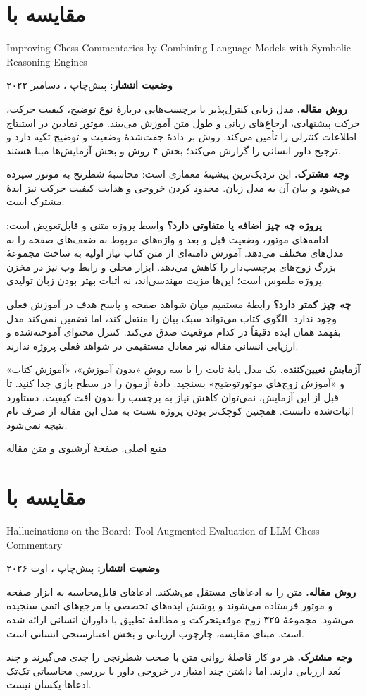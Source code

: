\documentclass[a4paper,12pt]{article}
\newcommand{\en}[1]{\lr{#1}}
\newcommand{\source}[2]{\par\small منبع اصلی: \href{#1}{#2}\par\normalsize}
\newcommand{\paper}[3]{\clearpage\section{#1}\begin{latin}\small #2\end{latin}\textbf{وضعیت انتشار:} #3\par}
\begin{document}
\paper{مقایسه با \en{Lee et al.}}{Improving Chess Commentaries by Combining Language Models with Symbolic Reasoning Engines}{پیش‌چاپ \en{arXiv}، دسامبر ۲۰۲۲}
\textbf{روش مقاله.} مدل زبانی کنترل‌پذیر با برچسب‌هایی دربارهٔ نوع توضیح، کیفیت حرکت، حرکت پیشنهادی، ارجاع‌های زبانی و طول متن آموزش می‌بیند. موتور نمادین در استنتاج اطلاعات کنترلی را تأمین می‌کند. روش بر دادهٔ جفت‌شدهٔ وضعیت و توضیح تکیه دارد و ترجیح داور انسانی را گزارش می‌کند؛ بخش ۴ روش و بخش آزمایش‌ها مبنا هستند.

\textbf{وجه مشترک.} این نزدیک‌ترین پیشینهٔ معماری است: محاسبهٔ شطرنج به موتور سپرده می‌شود و بیان آن به مدل زبان. محدود کردن خروجی و هدایت کیفیت حرکت نیز ایدهٔ مشترک است.

\textbf{پروژه چه چیز اضافه یا متفاوتی دارد؟} واسط پروژه متنی و قابل‌تعویض است: ادامه‌های موتور، وضعیت قبل و بعد و واژه‌های مربوط به ضعف‌های صفحه را به مدل‌های مختلف می‌دهد. آموزش دامنه‌ای از متن کتاب نیاز اولیه به ساخت مجموعهٔ بزرگ زوج‌های برچسب‌دار را کاهش می‌دهد. ابزار محلی و رابط وب نیز در مخزن پروژه ملموس است؛ این‌ها مزیت مهندسی‌اند، نه اثبات بهتر بودن زبان تولیدی.

\textbf{چه چیز کمتر دارد؟} رابطهٔ مستقیم میان شواهد صفحه و پاسخ هدف در آموزش فعلی وجود ندارد. الگوی کتاب می‌تواند سبک بیان را منتقل کند، اما تضمین نمی‌کند مدل بفهمد همان ایده دقیقاً در کدام موقعیت صدق می‌کند. کنترل محتوای آموخته‌شده و ارزیابی انسانی مقاله نیز معادل مستقیمی در شواهد فعلی پروژه ندارند.

\textbf{آزمایش تعیین‌کننده.} یک مدل پایهٔ ثابت را با سه روش «بدون آموزش»، «آموزش کتاب» و «آموزش زوج‌های موتورتوضیح» بسنجید. دادهٔ آزمون را در سطح بازی جدا کنید. تا قبل از این آزمایش، نمی‌توان کاهش نیاز به برچسب را بدون افت کیفیت، دستاورد اثبات‌شده دانست. همچنین کوچک‌تر بودن پروژه نسبت به مدل این مقاله از صرف نام \en{SLM} نتیجه نمی‌شود.
\source{https://arxiv.org/abs/2212.08195}{صفحهٔ آرشیوی و متن مقاله}

\paper{مقایسه با \en{Hebbar et al.}}{Hallucinations on the Board: Tool-Augmented Evaluation of LLM Chess Commentary}{پیش‌چاپ \en{arXiv}، اوت ۲۰۲۶}
\textbf{روش مقاله.} \en{ACT-Eval} متن را به ادعاهای مستقل می‌شکند. ادعاهای قابل‌محاسبه به ابزار صفحه و موتور فرستاده می‌شوند و پوشش ایده‌های تخصصی با مرجع‌های اتمی سنجیده می‌شود. مجموعهٔ ۳۲۵ زوج موقعیتحرکت و مطالعهٔ تطبیق با داوران انسانی ارائه شده است. مبنای مقایسه، چارچوب ارزیابی و بخش اعتبارسنجی انسانی است.

\textbf{وجه مشترک.} هر دو کار فاصلهٔ روانی متن با صحت شطرنجی را جدی می‌گیرند و چند بُعد ارزیابی دارند. اما داشتن چند امتیاز در خروجی داور با بررسی محاسباتی تک‌تک ادعاها یکسان نیست.
\end{document}

